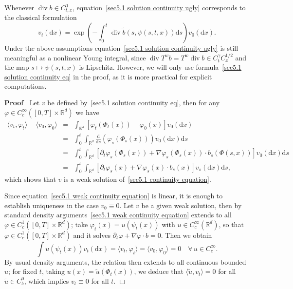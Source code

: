\documentclass[10pt]{article}
\newcommand{\mathd}{\mathrm{d}}
\newcommand{\tmop}[1]{\ensuremath{\operatorname{#1}}}
\newenvironment{proof}{\noindent\textbf{Proof\ }}{\hspace*{\fill}$\Box$\medskip}
\begin{document}
\begin{remark}
  Whenever $\tmop{div} b \in C^0_{t, x}$, equation~{\eqref{sec5.1 solution
  continuity ugly}} corresponds to the classical formulation
  \[ v_t (\mathd x) = \exp \left( - \int_0^t \tmop{div} \tilde{b} (s, \psi (s,
     t, x)) \mathd s \right) v_0 (\mathd x) . \]
  Under the above assumptions equation~{\eqref{sec5.1 solution continuity
  ugly}} is still meaningful as a nonlinear Young integral, since $\tmop{div}
  T^w b = T^w \tmop{div} b \in C^{\gamma}_t C^{1 / 2}_x$ and the map $s
  \mapsto \psi (s, t, x)$ is Lipschitz. However, we will only use
  formula~{\eqref{sec5.1 solution continuity eq}} in the proof, as it is more
  practical for explicit computations. 
\end{remark}

\begin{proof}
  Let $v$ be defined by~{\eqref{sec5.1 solution continuity eq}}, then for any
  $\varphi \in C^{\infty}_c ([0, T] \times \mathbb{R}^d)$ we have
  \begin{eqnarray*}
    \langle v_t, \varphi_t \rangle - \langle v_0, \varphi_0 \rangle & = &
    \int_{\mathbb{R}^d} [\varphi_t (\Phi_t (x)) - \varphi_0 (x)] v_0 (\mathd
    x)\\
    & = & \int_0^t \int_{\mathbb{R}^d} \frac{\mathd}{\mathd s} (\varphi_s
    (\Phi_s (x))) v_0 (\mathd x) \mathd s\\
    & = & \int_0^t \int_{\mathbb{R}^d} [\partial_t \varphi_s (\Phi_s (x)) +
    \nabla \varphi_s (\Phi_s (x)) \cdot b_s (\Phi (s, x))] v_0 (\mathd x)
    \mathd s\\
    & = & \int_0^t \int_{\mathbb{R}^d} [\partial_t \varphi_s (x) + \nabla
    \varphi_s (x) \cdot b_s (x)] v_s (\mathd x) \mathd s,
  \end{eqnarray*}
  which shows that $v$ is a weak solution of~{\eqref{sec5.1 continuity
  equation}}.
  
  Since equation~{\eqref{sec5.1 weak continuity equation}} is linear, it is
  enough to establish uniqueness in the case $v_0 \equiv 0$. Let $v$ be a
  given weak solution, then by standard density arguments~{\eqref{sec5.1 weak
  continuity equation}} extends to all $\varphi \in C^1_c ([0, T] \times
  \mathbb{R}^d)$; take $\varphi_t (x) = u (\psi_t (x))$ with $u \in
  C^{\infty}_c (\mathbb{R}^d)$, so that $\varphi \in C^1_c ([0, T] \times
  \mathbb{R}^d)$ and it solves $\partial_t \varphi + \nabla \varphi \cdot b =
  0$. Then we obtain
  \[ \int u (\psi_t (x)) v_t (\mathd x) = \langle v_t, \varphi_t \rangle =
     \langle v_0, \varphi_0 \rangle = 0 \quad \forall \, u \in C^{\infty}_c .
  \]
  By usual density arguments, the relation then extends to all continuous
  bounded $u$; for fixed $t$, taking $u (x) = \tilde{u} (\Phi_t (x))$, we
  deduce that $\langle \tilde{u}, v_t \rangle = 0$ for all $\tilde{u} \in
  C^0_b$, which implies $v_t \equiv 0$ for all $t$.
\end{proof}
\end{document}
